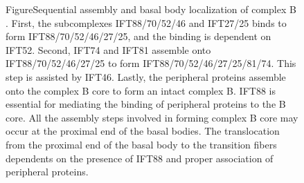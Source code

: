 \begin{figure}[htbp]
{
 {Figure}{Sequential assembly and basal body localization of complex B \citep{Richey2012}. First, the subcomplexes IFT88/70/52/46 and IFT27/25 binds to form IFT88/70/52/46/27/25, and the binding is dependent on IFT52. Second, IFT74 and IFT81 assemble onto IFT88/70/52/46/27/25 to form IFT88/70/52/46/27/25/81/74. This step is assisted by IFT46. Lastly, the peripheral proteins assemble onto the complex B core to form an intact complex B. IFT88 is essential for mediating the binding of peripheral proteins to the B core. All the assembly steps involved in forming complex B core may occur at the proximal end of the basal bodies. The translocation from the proximal end of the basal body to the transition fibers dependents on the presence of IFT88 and proper association of peripheral proteins.}
\par}
\end{figure}

